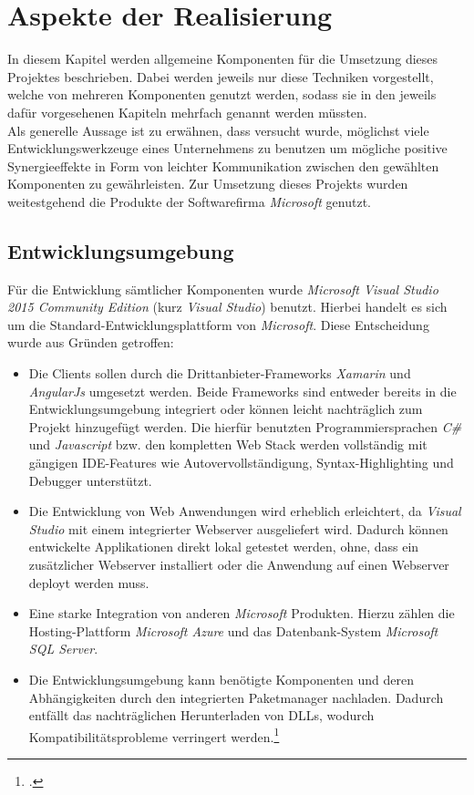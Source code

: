 \chapter{Aspekte der Realisierung}
\label{cha:realisierung}
In diesem Kapitel werden allgemeine Komponenten für die Umsetzung dieses Projektes beschrieben. Dabei werden jeweils nur diese Techniken vorgestellt, welche von mehreren Komponenten genutzt werden, sodass sie in den jeweils dafür vorgesehenen Kapiteln mehrfach genannt werden müssten. \\
Als generelle Aussage ist zu erwähnen, dass versucht wurde, möglichst viele Entwicklungswerkzeuge eines Unternehmens zu benutzen um mögliche positive Synergieeffekte in Form von leichter Kommunikation zwischen den gewählten Komponenten zu gewährleisten. Zur Umsetzung dieses Projekts wurden weitestgehend die Produkte der Softwarefirma \textit{Microsoft} genutzt.

\section{Entwicklungsumgebung}
\label{sec:entwicklungsumgebung}
Für die Entwicklung sämtlicher Komponenten wurde \textit{Microsoft Visual Studio 2015 Community Edition} (kurz \textit{Visual Studio}) benutzt. Hierbei handelt es sich um die Standard-Entwicklungsplattform von \textit{Microsoft}. Diese Entscheidung wurde aus Gründen getroffen:
\begin{itemize}
\item Die Clients sollen durch die Drittanbieter-Frameworks \textit{Xamarin} und \textit{AngularJs} umgesetzt werden. Beide Frameworks sind entweder bereits in die Entwicklungsumgebung integriert oder können leicht nachträglich zum Projekt hinzugefügt werden. Die hierfür benutzten Programmiersprachen \textit{C\#} und \textit{Javascript} bzw. den kompletten \ac{Web Stack} werden vollständig mit gängigen \ac{IDE}-Features wie Autovervollständigung, Syntax-Highlighting und Debugger unterstützt. 
\item Die Entwicklung von Web Anwendungen wird erheblich erleichtert, da \textit{Visual Studio} mit einem integrierter Webserver ausgeliefert wird. Dadurch können entwickelte Applikationen direkt lokal getestet werden, ohne, dass ein zusätzlicher Webserver installiert oder die Anwendung auf einen Webserver deployt werden muss.
\item Eine starke Integration von anderen \textit{Microsoft} Produkten. Hierzu zählen die Hosting-Plattform \textit{Microsoft Azure} und das Datenbank-System \textit{Microsoft SQL Server}.
\item Die Entwicklungsumgebung kann benötigte Komponenten und deren Abhängigkeiten durch den integrierten Paketmanager nachladen. Dadurch entfällt das nachträglichen Herunterladen von DLLs, wodurch Kompatibilitätsprobleme verringert werden.\footcite{online:VisualStudio}
\end{itemize}

